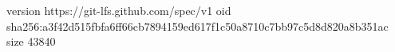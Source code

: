 version https://git-lfs.github.com/spec/v1
oid sha256:a3f42d515fbfa6ff66cb7894159ed617f1c50a8710c7bb97c5d8d820a8b351ac
size 43840
